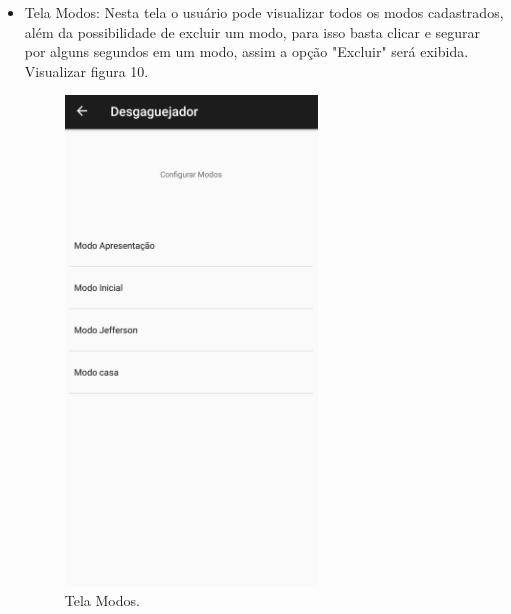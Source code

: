 \begin{itemize}
	\item Tela Modos: Nesta tela o usu\'ario pode visualizar todos os modos cadastrados, al\'em da possibilidade de excluir um modo, para isso basta clicar e segurar por alguns segundos em um modo, assim a op\c{c}\~ao "Excluir" ser\'a exibida. Visualizar figura 10.
	\begin{figure}[H]
		\centering
		\caption[Tela Modos]{Tela Modos. \label{fig:prototipotelapreferencias}}
		\includegraphics[height=13cm]{./Figuras/prototipo_telapreferencias.png}%
	\end{figure}


\end{itemize}
